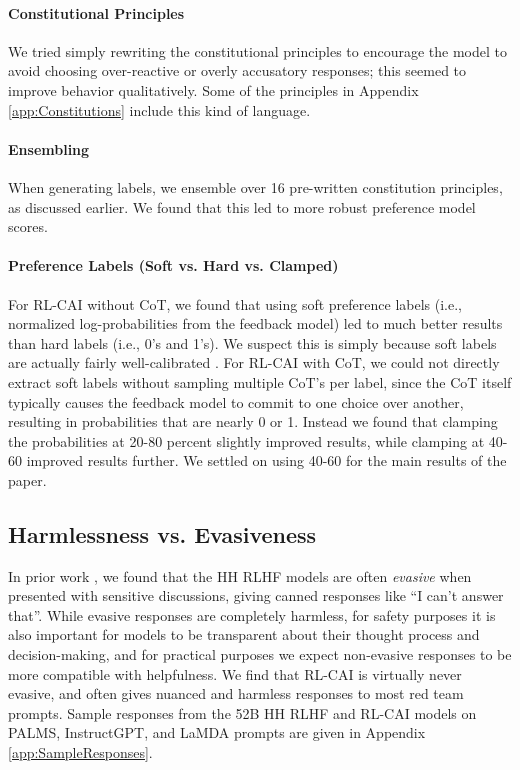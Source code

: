 \documentclass[english]{article}
\renewcommand\>{\rangle}
\begin{document}
\paragraph{Constitutional Principles}
We tried simply rewriting the constitutional principles to encourage the model to avoid choosing over-reactive or overly accusatory responses; this seemed to improve behavior qualitatively.  Some of the principles in Appendix \ref{app:Constitutions} include this kind of language.

\paragraph{Ensembling} When generating labels, we ensemble over 16 pre-written constitution principles, as discussed earlier. We found that this led to more robust preference model scores.

\paragraph{\bf Preference Labels (Soft vs. Hard vs. Clamped)}
For RL-CAI without CoT, we found that using soft preference labels (i.e., normalized log-probabilities from the feedback model) led to much better results than hard labels (i.e., 0's and 1's). We suspect this is simply because soft labels are actually fairly well-calibrated \cite{LMsKnowWhatTheyKnow}.
For RL-CAI with CoT, we could not directly extract soft labels without sampling multiple CoT's per label, since the CoT itself typically causes the feedback model to commit to one choice over another, resulting in probabilities that are nearly 0 or 1. Instead we found that clamping the probabilities at 20-80 percent slightly improved results, while clamping at 40-60 improved results further. We settled on using 40-60 for the main results of the paper. 


\subsection{Harmlessness vs. Evasiveness}
\label{sec:Evasive}


In prior work \cite{bai2022training}, we found that the HH RLHF models are often {\it evasive} when presented with sensitive discussions, giving canned responses like ``I can't answer that''. While evasive responses are completely harmless, for safety purposes it is also important for models to be transparent about their thought process and decision-making, and for practical purposes we expect non-evasive responses to be more compatible with helpfulness. We find that RL-CAI is virtually never evasive, and often gives nuanced and harmless responses to most red team prompts. Sample responses from the 52B HH RLHF and RL-CAI models on PALMS, InstructGPT, and LaMDA prompts are given in Appendix \ref{app:SampleResponses}. 
\end{document}

